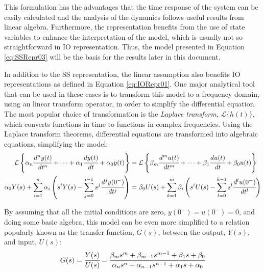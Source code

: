 \documentclass[a4paper,11pt]{book}
\numberwithin{figure}{chapter}
\numberwithin{equation}{chapter}
\numberwithin{table}{chapter}
\theoremstyle{definition}
\begin{document}
This formulation has the advantages that the time response of the system can be easily calculated and the analysis of the dynamics follows useful results from linear algebra. Furthermore, the representation benefits from the use of state variables to enhance the interpretation of the model, which is usually not so straightforward in IO representation. Thus, the model presented in Equation \eqref{eq:SSRepr03} will be the basis for the results later in this document.

In addition to the SS representation, the linear assumption also benefits IO representations as defined in Equation \eqref{eq:IORepr01}. One major analytical tool that can be used in these cases is to transform this model to a frequency domain, using an linear transform operator, in order to simplify the differential equation. The most popular choice of transformation is the \textit{Laplace transform}, $\mathcal{L}\{ h(t) \}$, which converts functions in time to functions in complex frequencies. Using the Laplace transform theorems, differential equations are transformed into algebraic equations, simplifying the model:
\begin{equation} \label{eq:IORepr02}
\begin{split}
    \mathcal{L} \left\{\alpha_n \cfrac{d^n y(t)}{dt^n} + \cdots + \alpha_{1} \cfrac{d y(t)}{dt} + \alpha_{0} y(t) \right\}  &= \mathcal{L} \left\{ \beta_m \cfrac{d^m u(t)}{dt^m} + \cdots + \beta_{1} \cfrac{d u(t)}{dt} + \beta_{0} u(t) \right \}  \\
    \alpha_0 Y(s) + \sum_{i=1}^{n} \alpha_i \left(s^i Y(s) - \sum^{i-1}_{j = 0} s^j \cfrac{d^j y(0^-)}{dt^j} \right) &= \beta_0 U(s) + \sum_{k=1}^{m} \beta_i \left(s^i U(s) - \sum^{k-1}_{l = 0} s^l \cfrac{d^l u(0^-)}{dt^l} \right)
\end{split}
\end{equation}

By assuming that all the initial conditions are zero, $y(0^-) = u(0^-) = 0$, and doing some basic algebra, this model can be even more simplified to a relation popularly known as the transfer function, $G(s)$, between the output, $Y(s)$, and input, $U(s)$:
\begin{equation} \label{eq:transFun01}
 G(s) = \cfrac{Y(s)}{U(s)} = \cfrac{\beta_m s^m + \beta_{m-1} s^{m-1} + \beta_{1} s + \beta_0}{\alpha_n s^n + \alpha_{n-1} s^{n-1} + \alpha_{1} s + \alpha_0}
\end{equation}
\end{document}
